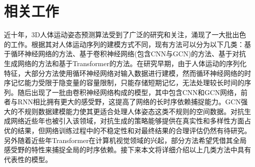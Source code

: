 \chapter{相关工作}


近十年，3D人体运动姿态预测算法受到了广泛的研究和关注，涌现了一大批出色的工作。根据其对人体运动序列的建模方式不同，现有方法可以分为以下几类：基于循环神经网络的方法\parencite{fragkiadaki2015recurrent,jain2016structural,ghosh2017learning,martinez2017human,gui2018adversarial,tang2018long,gui2018few,guo2019human,liu2019towards,chiu2019action,gopalakrishnan2019neural,sang2020human,corona2020context,pavllo2020modeling}、基于卷积神经网络(包含CNN与GCN)的方法\parencite{aksan2019structured,mao2019learning,mao2020history,cui2020learning,li2020dynamic,li2021symbiotic,li2020multitask,liu2020multi,lebailly2020motion,dang2021msr,cui2021towards,Shi:AAAI2022,Shi:CVPR2021,Duan:AAAI2022,butepage2017deep,li2018convolutional,liu2020trajectorycnn}、基于对抗生成网络的方法\parencite{barsoum2018hp,kundu2019bihmp,hernandez2019human,jain2020gan,liu2021aggregated,cui2021efficient,gui2018adversarial,chao2020adversarial,lyu2021learning}和基于Transformer\parencite{aksan2021spatio}的方法。在研究早期，由于人体运动的序列化特征，大部分方法使用循环神经网络对输入数据进行建模，然而循环神经网络的时序记忆能力受限于隐变量的容量限制，只能存储短期记忆，无法处理较长时间的序列。随后出现了一批由卷积神经网络构成的模型，其中包含CNN和GCN网络，前者与RNN相比拥有更大的感受野，这提高了网络的长时序依赖捕捉能力。GCN强大的不规则数据建模能力使其更适合处理人体姿态这类不规则的空间数据。对抗生成网络近些年也被引入该领域，对抗生成的策略能够提供在真实性和多样性方面占优的结果，但网络训练过程中的不稳定性和对最终结果的合理评估仍然有待研究。另外随着近些年Transformer在计算机视觉领域的兴起，部分方法希望凭借其全局感受野的特性来捕捉全局的时序依赖。接下来本文将详细介绍以上几类方法中具有代表性的模型。

